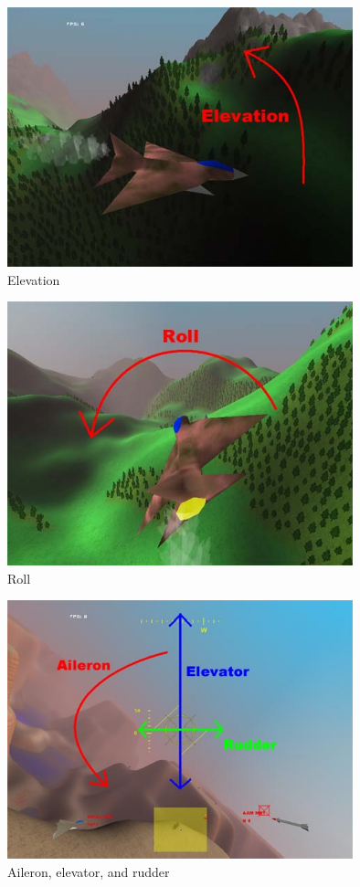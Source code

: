 \begin{figure}
\begin{center}
\includegraphics[width=10cm]{elevation.jpg}
\caption{Elevation}
\label{fig:elevation}
\end{center}
\end{figure}

\begin{figure}
\begin{center}
\includegraphics[width=10cm]{roll.jpg}
\caption{Roll}
\label{fig:roll}
\end{center}
\end{figure}

\begin{figure}
\begin{center}
\includegraphics[width=10cm]{fly.jpg}
\caption{Aileron, elevator, and rudder}
\label{fig:fly}
\end{center}
\end{figure}


